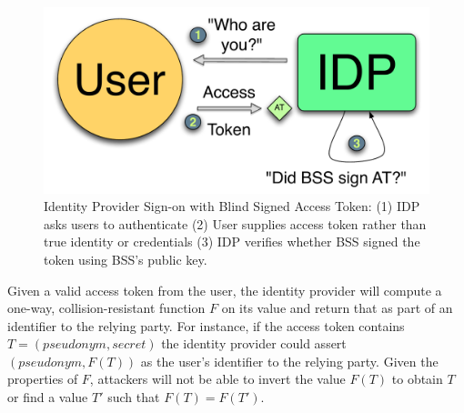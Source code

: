 \documentclass{llncs}
\begin{document}
\begin{figure}
  \centering
  \includegraphics[scale=0.6]{figs/fig-bss-signon-color.pdf}
  \caption{Identity Provider Sign-on with Blind Signed Access Token:
    (1) IDP asks users to authenticate (2) User supplies access token
    rather than true identity or credentials (3) IDP verifies whether
    BSS signed the token using BSS's public key.}
  \label{fig:bss-signon}
\end{figure}

Given a valid access token from the user, the identity provider will
compute a one-way, collision-resistant function $F$ on its value and
return that as part of an identifier to the relying party. For
instance, if the access token contains $T = (pseudonym, secret)$ the
identity provider could assert $(pseudonym, F(T))$ as the user's
identifier to the relying party. Given the properties of $F$,
attackers will not be able to invert the value $F(T)$ to obtain $T$ or
find a value $T'$ such that $F(T) = F(T')$.
\end{document}
